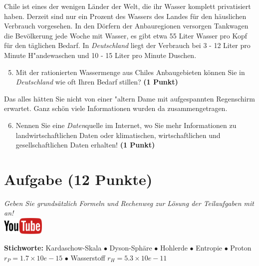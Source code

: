 \documentclass[a4paper, 9pt]{scrartcl}\usepackage[]{graphicx}\usepackage[]{xcolor}
\begin{document}
Chile ist eines der wenigen Länder der Welt, die ihr Wasser komplett privatisiert haben. Derzeit sind nur ein Prozent des Wassers des Landes für den häuslichen Verbrauch vorgesehen. In den Dörfern der Anbauregionen versorgen Tankwagen die Bevölkerung jede Woche mit Wasser, es gibt etwa 55 Liter Wasser pro Kopf für den täglichen Bedarf. In \textit{Deutschland} liegt der Verbrauch bei 3 - 12 Liter pro Minute H{"a}ndewaschen und 10 - 15 Liter pro Minute Duschen.

\begin{enumerate}
  \setcounter{enumi}{4}
\item Mit der rationierten Wassermenge aus Chiles Anbaugebieten können Sie in \textit{Deutschland} wie oft Ihren Bedarf stillen? \textbf{(1 Punkt)}
\end{enumerate}

Das alles hätten Sie nicht von einer {"a}ltern Dame mit aufgespannten Regenschirm erwartet. Ganz schön viele Informationen wurden da zusammengetragen.

\begin{enumerate}
  \setcounter{enumi}{5}  
  \item Nennen Sie eine \textit{Daten}quelle im Internet, wo Sie mehr Informationen zu landwirtschaftlichen Daten oder klimatischen, wirtschaftlichen und gesellschaftlichen Daten erhalten! \textbf{(1 Punkt)}
\end{enumerate} 
\clearpage

\section{Aufgabe \hfill (12 Punkte)}

\textit{Geben Sie grunds{\"a}tzlich Formeln und Rechenweg zur L{\"o}sung der
  Teilaufgaben mit an!} \\[1Ex]

\hfill\href{https://youtu.be/WZSxntiNF8s}{\includegraphics[width = 2cm]{img/youtube}} %
\hspace{2Ex}

{\tiny\textbf{Stichworte:} Kardaschow-Skala $\bullet$ Dyson-Sphäre $\bullet$ Hohlerde $\bullet$ Entropie $\bullet$ Proton $r_P = 1.7 \times 10e-15$ $\bullet$ Wasserstoff $r_H = 5.3\times 10e-11$}
\end{document}

